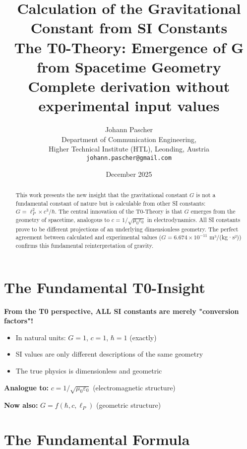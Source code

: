 \documentclass[12pt,a4paper]{article}
\title{\textbf{Calculation of the Gravitational Constant from SI Constants}\\[0.5cm]
	\large The T0-Theory: Emergence of G from Spacetime Geometry\\[0.3cm]
	\normalsize Complete derivation without experimental input values}
\author{Johann Pascher\\
	\small Department of Communication Engineering,\\
	\small Higher Technical Institute (HTL), Leonding, Austria\\
	\small \texttt{johann.pascher@gmail.com}}
\date{December 2025}
\theoremstyle{definition}
\begin{document}
	
	\maketitle
	
	\begin{abstract}
		This work presents the new insight that the gravitational constant $G$ is not a fundamental constant of nature but is calculable from other SI constants: $G = \ell_P^2 \times c^3 / \hbar$. The central innovation of the T0-Theory is that $G$ emerges from the geometry of spacetime, analogous to $c = 1/\sqrt{\mu_0\varepsilon_0}$ in electrodynamics. All SI constants prove to be different projections of an underlying dimensionless geometry. The perfect agreement between calculated and experimental values ($G = 6.674 \times 10^{-11}$ m³/(kg·s²)) confirms this fundamental reinterpretation of gravity.
	\end{abstract}
	
	\tableofcontents
	\newpage
	
	\section{The Fundamental T0-Insight}
	
	\begin{revolution}
		\textbf{From the T0 perspective, ALL SI constants are merely "conversion factors"!}
		
		\begin{itemize}
			\item In natural units: $G = 1$, $c = 1$, $\hbar = 1$ (exactly)
			\item SI values are only different descriptions of the same geometry
			\item The true physics is dimensionless and geometric
		\end{itemize}
		
		\textbf{Analogue to:} $c = 1/\sqrt{\mu_0\varepsilon_0}$ (electromagnetic structure)
		
		\textbf{Now also:} $G = f(\hbar, c, \ell_P)$ (geometric structure)
	\end{revolution}
	
	\section{The Fundamental Formula}
	
\end{document}
